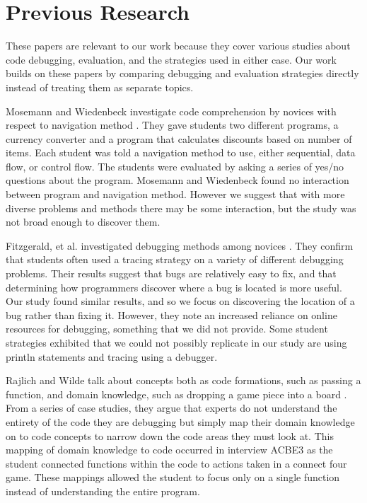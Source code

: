 \section{Previous Research}

These papers are relevant to our work because they cover various studies about code debugging, evaluation, and the strategies used in either case. Our work builds on these papers by comparing debugging and evaluation strategies directly instead of treating them as separate topics.


Mosemann and Wiedenbeck investigate code comprehension by novices with respect to navigation method \cite{mosemann2001}.
They gave students two different programs, a currency converter and a program that calculates discounts based on number of items.
Each student was told a navigation method to use, either sequential, data flow, or control flow.
The students were evaluated by asking a series of yes/no questions about the program.
Mosemann and Wiedenbeck found no interaction between program and navigation method.
However we suggest that with more diverse problems and methods there may be some interaction, but the study was not broad enough to discover them.

Fitzgerald, et al. investigated debugging methods among novices \cite{fitzgerald2008}.
They confirm that students often used a tracing strategy on a variety of different debugging problems.
Their results suggest that bugs are relatively easy to fix, and that determining how programmers discover where a bug is located is more useful.
Our study found similar results, and so we focus on discovering the location of a bug rather than fixing it.
However, they note an increased reliance on online resources for debugging, something that we did not provide.
Some student strategies exhibited that we could not possibly replicate in our study are using println statements and tracing using a debugger.

Rajlich and Wilde talk about concepts both as code formations, such as passing a function, and domain knowledge, such as dropping a game piece into a board \cite{1021348}.
From a series of case studies, they argue that experts do not understand the entirety of the code they are debugging but simply map their domain knowledge on to code concepts to narrow down the code areas they must look at.
This mapping of domain knowledge to code occurred in interview ACBE3 as the student connected functions within the code to actions taken in a connect four game.
These mappings allowed the student to focus only on a single function instead of understanding the entire program.

